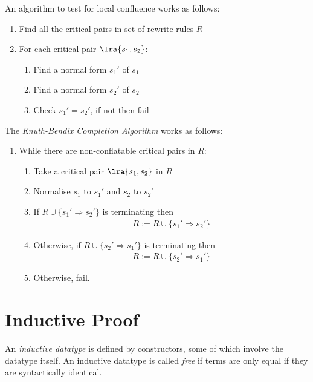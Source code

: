 \documentclass{article}
\begin{document}
\begin{theorem}
	An algorithm to test for local confluence works as follows:
	\begin{enumerate}
		\item Find all the critical pairs in set of rewrite rules $R$
		\item For each critical pair $\lra{s_1, s_2}$: \begin{enumerate}
			      \item Find a normal form $s_1'$ of $s_1$
			      \item Find a normal form $s_2'$ of $s_2$
			      \item Check $s_1'=s_2'$, if not then fail
		      \end{enumerate}
	\end{enumerate}
\end{theorem}

\begin{theorem}
	The \emph{Knuth-Bendix Completion Algorithm} works as follows:
	\begin{enumerate}
		\item While there are non-conflatable critical pairs in $R$: \begin{enumerate}
			      \item Take a critical pair $\lra{s_1, s_2}$ in $R$
			      \item Normalise $s_1$ to $s_1'$ and $s_2$ to $s_2'$
			      \item If $R\cup\{s_1'\Rightarrow s_2'\}$ is terminating then \begin{align*}
				            R := R \cup \{s_1'\Rightarrow s_2'\}
			            \end{align*}
			      \item Otherwise, if $R\cup\{s_2'\Rightarrow s_1'\}$ is terminating then \begin{align*}
				            R := R \cup \{s_2' \Rightarrow s_1'\}
			            \end{align*}
			      \item Otherwise, fail.
		      \end{enumerate}
	\end{enumerate}
\end{theorem}

\section{Inductive Proof}

\begin{definition}
	An \emph{inductive datatype} is defined by constructors, some of which involve the datatype
	itself. An inductive datatype is called \emph{free} if terms are only equal if they are
	syntactically identical.
\end{definition}
\end{document}
